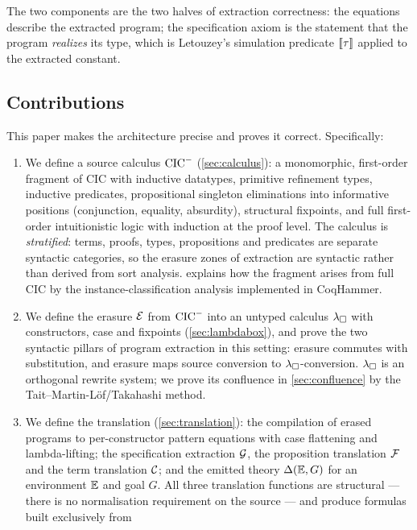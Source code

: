 The two components are the two halves of extraction correctness: the
equations describe the extracted program; the specification axiom is the
statement that the program \emph{realizes} its type, which is Letouzey's
simulation predicate $[\![ \tau ]\!]$ \cite[\S 2.4]{Letouzey2004} applied to
the extracted constant.

\subsection{Contributions}
\label{sec:intro-contrib}

This paper makes the architecture precise and proves it correct.
Specifically:

\begin{enumerate}[leftmargin=2em]
\item We define a source calculus $\mathrm{CIC}^{-}$ (\cref{sec:calculus}): a
  monomorphic, first-order fragment of CIC with inductive datatypes,
  primitive refinement types, inductive predicates, propositional
  singleton eliminations into informative positions (conjunction,
  equality, absurdity), structural fixpoints, and full first-order
  intuitionistic logic with induction at the proof level.  The calculus is
  \emph{stratified}: terms, proofs, types, propositions and predicates are
  separate syntactic categories, so the erasure zones of extraction are
  syntactic rather than derived from sort analysis.  
  explains how the fragment arises from full CIC by the
  instance-classification analysis implemented in CoqHammer.
\item We define the erasure $\mathcal{E}$ from $\mathrm{CIC}^{-}$ into an untyped calculus
  $\lambda_{\square}$ with constructors, case and fixpoints (\cref{sec:lambdabox}), and
  prove the two syntactic pillars of program extraction in this setting:
  erasure commutes with substitution, and erasure maps source conversion to
  $\lambda_{\square}$-conversion.  $\lambda_{\square}$ is an orthogonal rewrite system; we prove its
  confluence in \cref{sec:confluence} by the Tait--Martin-L{\"o}f/Takahashi
  method.
\item We define the translation (\cref{sec:translation}): the compilation of
  erased programs to per-constructor pattern equations with case flattening
  and lambda-lifting; the specification extraction $\mathcal{G}$, the
  proposition translation $\mathcal{F}$ and the term translation $\mathcal{C}$; and the
  emitted theory $\Delta(\mathbb{E},G)$ for an environment $\mathbb{E}$ and goal $G$.  All three
  translation functions are structural --- there is no normalisation
  requirement on the source --- and produce formulas built exclusively from

\end{enumerate}
